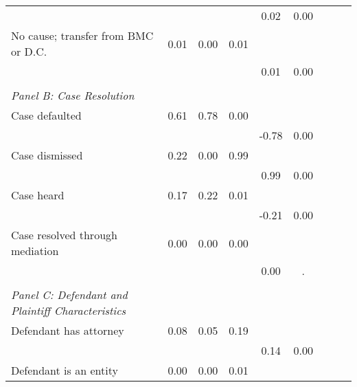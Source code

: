 \begin{table}[htbp]
\begin{tabular}{l*{4}{cc}}
                    &            &            &            &        0.02&        0.00\\
\hspace{0.25cm}No cause; transfer from BMC or D.C.&        0.01&        0.00&        0.01&            &            \\
                    &            &            &            &        0.01&        0.00\\
\vspace{0.1em} \\ \emph{Panel B: Case Resolution}&            &            &            &            &            \\
\hspace{0.25cm}Case defaulted&        0.61&        0.78&        0.00&            &            \\
                    &            &            &            &       -0.78&        0.00\\
\hspace{0.25cm}Case dismissed&        0.22&        0.00&        0.99&            &            \\
                    &            &            &            &        0.99&        0.00\\
\hspace{0.25cm}Case heard&        0.17&        0.22&        0.01&            &            \\
                    &            &            &            &       -0.21&        0.00\\
\hspace{0.25cm}Case resolved through mediation&        0.00&        0.00&        0.00&            &            \\
                    &            &            &            &        0.00&           .\\
\vspace{0.1em} \\ \emph{Panel C: Defendant and Plaintiff Characteristics}&            &            &            &            &            \\
\hspace{0.25cm}Defendant has attorney&        0.08&        0.05&        0.19&            &            \\
                    &            &            &            &        0.14&        0.00\\
\hspace{0.25cm}Defendant is an entity&        0.00&        0.00&        0.01&            &            \\

\end{tabular}
\end{table}
